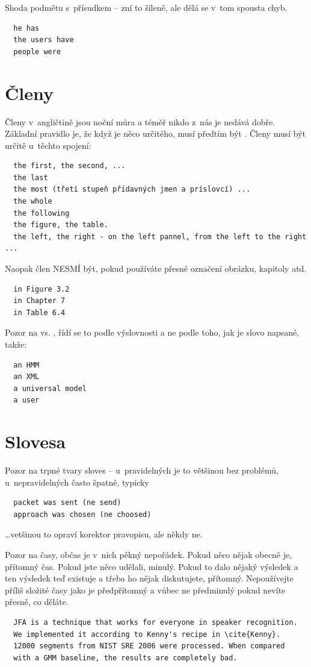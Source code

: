 \noindent Shoda podmětu s~přísudkem -- zní to šíleně, ale dělá se v~tom spousta chyb. 

\begin{verbatim}
  he has 
  the users have 
  people were 
\end{verbatim}

\section*{Členy}

Členy v~angličtině jsou noční můra a téměř nikdo z~nás je nedává dobře. Základní pravidlo je, že když je něco určitého, musí předtím být . Členy musí být určitě u~těchto spojení:
\begin{verbatim}
  the first, the second, ...
  the last
  the most (třetí stupeň přídavných jmen a príslovcí) ...
  the whole 
  the following 
  the figure, the table. 
  the left, the right - on the left pannel, from the left to the right ... 
\end{verbatim}

\noindent Naopak člen NESMÍ být, pokud používáte přesné označení obrázku, kapitoly atd.
\begin{verbatim}
  in Figure 3.2
  in Chapter 7
  in Table 6.4
\end{verbatim}

\begin{samepage}
\noindent Pozor na  vs. , řídí se to podle výslovnosti a ne podle toho, jak je slovo napsané, takže:
\begin{verbatim}
  an HMM
  an XML
  a universal model
  a user
\end{verbatim}
\end{samepage}

\section*{Slovesa}

Pozor na trpné tvary sloves -- u~pravidelných je to většinou bez problémů, u~nepravidelných často špatně, typicky
\begin{verbatim}
  packet was sent (ne send)
  approach was chosen (ne choosed)
\end{verbatim}
\noindent \ldots vetšinou to opraví korektor pravopisu, ale někdy ne. 

Pozor na časy, občas je v~nich pěkný nepořádek. Pokud něco nějak obecně je, přítomný čas. Pokud jste něco udělali, minulý. Pokud to dalo nějaký výsledek a ten výsledek teď existuje a třeba ho nějak diskutujete, přítomný. Nepoužívejte příliš složité časy jako je předpřítomný a vůbec ne předminulý pokud nevíte přesně, co děláte.
\begin{verbatim}
  JFA is a technique that works for everyone in speaker recognition. 
  We implemented it according to Kenny's recipe in \cite{Kenny}. 
  12000 segments from NIST SRE 2006 were processed. When compared 
  with a GMM baseline, the results are completely bad. 
\end{verbatim}

